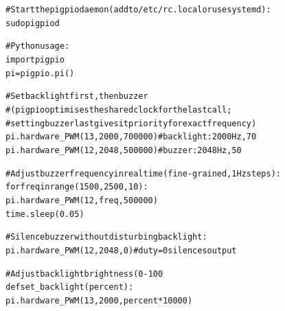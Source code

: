 \documentclass[11pt,a4paper]{article}
\begin{document}
\begin{alltt}\small
# Start the pigpio daemon (add to /etc/rc.local or use systemd):
sudo pigpiod

# Python usage:
import pigpio
pi = pigpio.pi()

# Set backlight first, then buzzer
# (pigpio optimises the shared clock for the last call;
#  setting buzzer last gives it priority for exact frequency)
pi.hardware_PWM(13, 2000, 700000)   # backlight: 2000 Hz, 70%
pi.hardware_PWM(12, 2048, 500000)   # buzzer: 2048 Hz, 50%

# Adjust buzzer frequency in real time (fine-grained, 1 Hz steps):
for freq in range(1500, 2500, 10):
    pi.hardware_PWM(12, freq, 500000)
    time.sleep(0.05)

# Silence buzzer without disturbing backlight:
pi.hardware_PWM(12, 2048, 0)        # duty=0 silences output

# Adjust backlight brightness (0-100%
def set_backlight(percent):
    pi.hardware_PWM(13, 2000, percent * 10000)
\end{alltt}
\end{document}
